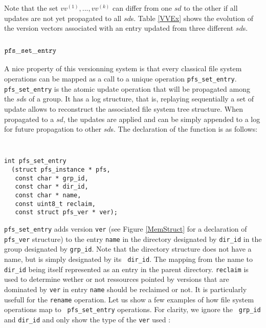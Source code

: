 Note that the set $vv^{(1)},..., vv^{(k)}$ can differ from one $sd$ to
the other if all updates are not yet propagated to all $sd$s. Table \ref{VVEx}
shows the evolution of the version vectors associated with an
entry updated from three different $sd$s.

\subsection {${\tt pfs\_set\_entry}$}

A nice property of this versionning system is that every classical
file system operations can be mapped as a call to a unique
operation {\tt pfs\_set\_entry}. {\tt pfs\_set\_entry} is the atomic
update operation that will be propagated among the $sd$s of a group.
It has a log structure, that is, replaying sequentially a set of update
allows to reconstruct the associated file system tree structure. When
propagated to a $sd$, the updates are applied and can be simply appended to a
log for future propagation to other $sd$s.  
The declaration of the function is as follows:

\begin{center}
{\tt \small
\begin{verbatim}
int pfs_set_entry 
  (struct pfs_instance * pfs,
   const char * grp_id,
   const char * dir_id,
   const char * name,
   const uint8_t reclaim,
   const struct pfs_ver * ver);
\end{verbatim}
}
\end{center}

{\tt pfs\_set\_entry} adds version {\tt ver} (see Figure
\ref{MemStruct} for a declaration of {\tt pfs\_ver} structure) to the
entry {\tt name} in the directory designated by {\tt dir\_id} in the
group designated by {\tt grp\_id}. Note that the directory structure
does not have a name, but is simply designated by its {\tt
  dir\_id}. The mapping from the name to {\tt dir\_id} being itself
represented as an entry in the parent directory.  {\tt reclaim} is
used to determine wether or not ressources pointed by versions that
are dominated by {\tt ver} in entry {\tt name} should be reclaimed or
not. It is particularly usefull for the {\tt rename} operation. Let us
show a few examples of how file system operations map to {\tt
  pfs\_set\_entry} operations. For clarity, we ignore the {\tt
  grp\_id} and {\tt dir\_id} and only show the type of the {\tt ver}
used :

